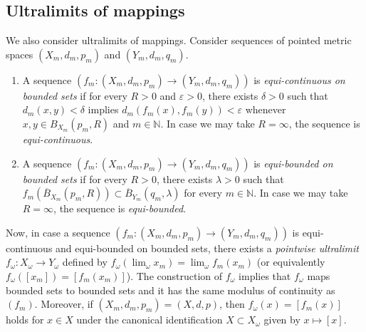 \documentclass[a4paper,leqno]{amsart}
\numberwithin{equation}{section}
\theoremstyle{remark}
\theoremstyle{remark}
\newcommand{\N}{\mathbb{N}}
\begin{document}
\subsection{Ultralimits of mappings}\label{section-ultralimits-of-mappings}
We also consider ultralimits of mappings. Consider sequences of pointed metric spaces $( X_m, d_m, p_m )$ and $( Y_m, d_m, q_m )$.
\begin{enumerate}
    \item A sequence $( f_m \colon (X_m,d_m,p_m) \to ( Y_m, d_m, q_m ) )$ is \emph{equi-continuous on bounded sets} if for every $R > 0$ and $\varepsilon > 0$, there exists $\delta > 0$ such that $d_m( x, y ) < \delta$ implies $d_m( f_m(x), f_m(y) ) < \varepsilon$ whenever $x, y \in B_{X_m}( p_m, R )$ and $m \in \N$.  In case we may take $R = \infty$, the sequence is \emph{equi-continuous}.
    \item A sequence $( f_m \colon (X_m,d_m,p_m) \to ( Y_m, d_m, q_m ) )$ is \emph{equi-bounded on bounded sets} if for every $R > 0$, there exists $\lambda > 0$ such that $f_m( \overline{B}_{X_m}( p_m, R ) ) \subset \overline{B}_{Y_m}( q_m, \lambda )$ for every $m \in \N$. In case we may take $R = \infty$, the sequence is \emph{equi-bounded}.
\end{enumerate}
Now, in case a sequence $( f_m \colon (X_m,d_m,p_m) \to ( Y_m, d_m, q_m ) )$ is equi-continuous and equi-bounded on bounded sets, there exists a \emph{pointwise ultralimit} $f_\omega \colon X_\omega \to Y_\omega$ defined by $f_\omega( \lim_\omega x_m ) = \lim_\omega f_m(x_m)$ (or equivalently $f_\omega( [x_m] ) = [f_m(x_m)]$). The construction of $f_\omega$ implies that $f_\omega$ maps bounded sets to bounded sets and it has the same modulus of continuity as $( f_m )$. Moreover, if $( X_m, d_m, p_m ) = ( X, d, p )$, then $f_\omega(x) = [f_m(x)]$ holds for $x \in X$ under the canonical identification $X \subset X_\omega$ given by $x \mapsto [x]$.
\end{document}
